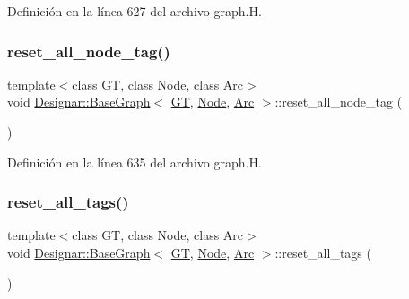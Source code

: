 Definición en la línea 627 del archivo graph.\+H.

\mbox{\label{class_designar_1_1_base_graph_a7bffa4f055b15f76d12bd7c40730a3dd}} 
\subsubsection{\texorpdfstring{reset\+\_\+all\+\_\+node\+\_\+tag()}{reset\_all\_node\_tag()}\hspace{0.1cm}{\footnotesize\ttfamily [2/2]}}
{\footnotesize\ttfamily template$<$class GT, class Node, class Arc$>$ \\
void \hyperlink{class_designar_1_1_base_graph}{Designar\+::\+Base\+Graph}$<$ \hyperlink{demo-buildgraph_8_c_a3001c40d2c31ca87ed96cd7d1334a55e}{GT}, \hyperlink{namespace_designar_a5af326c65aa2bd26b26c410f2030d09e}{Node}, \hyperlink{namespace_designar_a3f55fb5513d62ff47cbc8f72b8e95d6f}{Arc} $>$\+::reset\+\_\+all\+\_\+node\+\_\+tag (\begin{DoxyParamCaption}{ }\end{DoxyParamCaption})\hspace{0.3cm}{\ttfamily [inline]}}



Definición en la línea 635 del archivo graph.\+H.

\mbox{\label{class_designar_1_1_base_graph_ae62e72668468a2aaa3ddc91246e1ee1c}} 
\subsubsection{\texorpdfstring{reset\+\_\+all\+\_\+tags()}{reset\_all\_tags()}}
{\footnotesize\ttfamily template$<$class GT, class Node, class Arc$>$ \\
void \hyperlink{class_designar_1_1_base_graph}{Designar\+::\+Base\+Graph}$<$ \hyperlink{demo-buildgraph_8_c_a3001c40d2c31ca87ed96cd7d1334a55e}{GT}, \hyperlink{namespace_designar_a5af326c65aa2bd26b26c410f2030d09e}{Node}, \hyperlink{namespace_designar_a3f55fb5513d62ff47cbc8f72b8e95d6f}{Arc} $>$\+::reset\+\_\+all\+\_\+tags (\begin{DoxyParamCaption}{ }\end{DoxyParamCaption})\hspace{0.3cm}{\ttfamily [inline]}}



